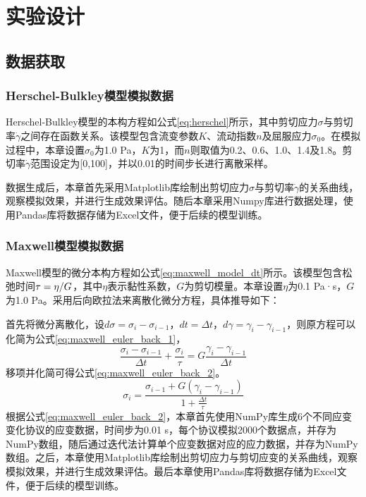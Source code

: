 \section{实验设计}
\subsection{数据获取}
\subsubsection{Herschel-Bulkley模型模拟数据}
Herschel-Bulkley模型的本构方程如公式\eqref{eq:herschel}所示，其中剪切应力$\sigma$与剪切率$\dot{\gamma}$之间存在函数关系。该模型包含流变参数$K$、流动指数$n$及屈服应力$\sigma_0$。在模拟过程中，本章设置$\sigma_0$为1.0 Pa，$K$为1，而$n$则取值为0.2、0.6、1.0、1.4及1.8。剪切率$\dot{\gamma}$范围设定为[0,100]，并以0.01的时间步长进行离散采样。

数据生成后，本章首先采用Matplotlib库绘制出剪切应力$\sigma$与剪切率$\dot{\gamma}$的关系曲线，观察模拟效果，并进行生成效果评估。随后本章采用Numpy库进行数据处理，使用Pandas库将数据存储为Excel文件，便于后续的模型训练。
\subsubsection{Maxwell模型模拟数据}
Maxwell模型的微分本构方程如公式\eqref{eq:maxwell_model_dt}所示。该模型包含松弛时间$\tau=\eta/\\G$，其中$\eta$表示黏性系数，$G$为剪切模量。本章设置$\eta$为0.1 Pa·s，$G$为1.0 Pa。采用后向欧拉法来离散化微分方程，具体推导如下：

首先将微分离散化，设$d\sigma=\sigma_i - \sigma_{i-1}$，$dt=\Delta t$，$d\gamma=\gamma_i - \gamma_{i-1}$，则原方程可以化简为公式\eqref{eq:maxwell_euler_back_1}，
\begin{equation}
  \frac{\sigma_i - \sigma_{i-1}}{\Delta t} + \frac{\sigma_i}{\tau} = G \frac{\gamma_i - \gamma_{i-1}}{\Delta t} \label{eq:maxwell_euler_back_1}
\end{equation}
移项并化简可得公式\eqref{eq:maxwell_euler_back_2}。
\begin{equation}
  \sigma_i = \frac{\sigma_{i-1} + G (\gamma_i - \gamma_{i-1})}{1 + \frac{\Delta t}{\tau}} \label{eq:maxwell_euler_back_2}
\end{equation}
根据公式\eqref{eq:maxwell_euler_back_2}，本章首先使用NumPy库生成6个不同应变变化协议的应变数据，时间步为0.01 s，每个协议模拟2000个数据点，并存为NumPy数组，随后通过迭代法计算单个应变数据对应的应力数据，并存为NumPy数组。之后，本章使用Matplotlib库绘制出剪切应力与剪切应变的关系曲线，观察模拟效果，并进行生成效果评估。最后本章使用Pandas库将数据存储为Excel文件，便于后续的模型训练。
